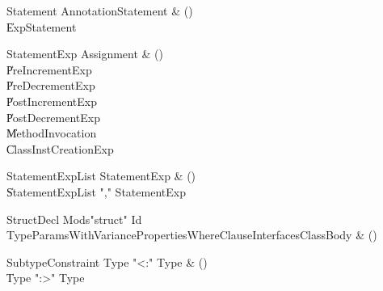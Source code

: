 \begin{bbgrammar}

Statement \label{prod:Statement}  \: AnnotationStatement & () \\

    \| ExpStatement \\

\end{bbgrammar}

\begin{bbgrammar}

StatementExp \label{prod:StatementExp}  \: Assignment & () \\

    \| PreIncrementExp \\
    \| PreDecrementExp \\
    \| PostIncrementExp \\
    \| PostDecrementExp \\
    \| MethodInvocation \\
    \| ClassInstCreationExp \\

\end{bbgrammar}

\begin{bbgrammar}

StatementExpList \label{prod:StatementExpList}  \: StatementExp & () \\

    \| StatementExpList \xcd"," StatementExp \\

\end{bbgrammar}

\begin{bbgrammar}

StructDecl \label{prod:StructDecl}  \: Mods\opt \xcd"struct" Id TypeParamsWithVariance\opt Properties\opt WhereClause\opt Interfaces\opt ClassBody & () \\


\end{bbgrammar}

\begin{bbgrammar}

SubtypeConstraint \label{prod:SubtypeConstraint}  \: Type  \xcd"<:" Type  & () \\

    \| Type  \xcd":>" Type  \\

\end{bbgrammar}

